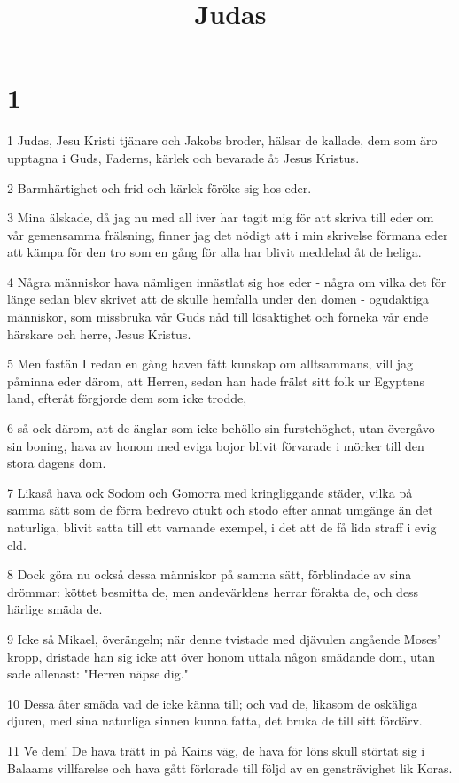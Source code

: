 

\title{Judas}


\chapter{1}

\par 1 Judas, Jesu Kristi tjänare och Jakobs broder, hälsar de kallade, dem som äro upptagna i Guds, Faderns, kärlek och bevarade åt Jesus Kristus.
\par 2 Barmhärtighet och frid och kärlek föröke sig hos eder.
\par 3 Mina älskade, då jag nu med all iver har tagit mig för att skriva till eder om vår gemensamma frälsning, finner jag det nödigt att i min skrivelse förmana eder att kämpa för den tro som en gång för alla har blivit meddelad åt de heliga.
\par 4 Några människor hava nämligen innästlat sig hos eder - några om vilka det för länge sedan blev skrivet att de skulle hemfalla under den domen - ogudaktiga människor, som missbruka vår Guds nåd till lösaktighet och förneka vår ende härskare och herre, Jesus Kristus.
\par 5 Men fastän I redan en gång haven fått kunskap om alltsammans, vill jag påminna eder därom, att Herren, sedan han hade frälst sitt folk ur Egyptens land, efteråt förgjorde dem som icke trodde,
\par 6 så ock därom, att de änglar som icke behöllo sin furstehöghet, utan övergåvo sin boning, hava av honom med eviga bojor blivit förvarade i mörker till den stora dagens dom.
\par 7 Likaså hava ock Sodom och Gomorra med kringliggande städer, vilka på samma sätt som de förra bedrevo otukt och stodo efter annat umgänge än det naturliga, blivit satta till ett varnande exempel, i det att de få lida straff i evig eld.
\par 8 Dock göra nu också dessa människor på samma sätt, förblindade av sina drömmar: köttet besmitta de, men andevärldens herrar förakta de, och dess härlige smäda de.
\par 9 Icke så Mikael, överängeln; när denne tvistade med djävulen angående Moses' kropp, dristade han sig icke att över honom uttala någon smädande dom, utan sade allenast: "Herren näpse dig."
\par 10 Dessa åter smäda vad de icke känna till; och vad de, likasom de oskäliga djuren, med sina naturliga sinnen kunna fatta, det bruka de till sitt fördärv.
\par 11 Ve dem! De hava trätt in på Kains väg, de hava för löns skull störtat sig i Balaams villfarelse och hava gått förlorade till följd av en gensträvighet lik Koras.
